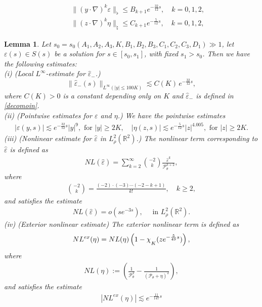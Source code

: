 \documentclass[10pt,a4paper]{amsart}
\newtheorem{lemma}{Lemma}
\newcommand{\mchi}{\raisebox{0pt}[1ex][1ex]{$\chi$}}
\newcommand{\veph}{\hat\varepsilon }
\begin{document}
\begin{align}
    &\|(y \cdot \nabla)^k\varepsilon\|_{\flat} \leq B_{k+1} e^{-\frac{32}{12}s}, \quad k=0,1,2,\label{int1}\\
   \quad  &\|(z \cdot \nabla)^k \eta \|_{\natural} \leq C_{k+1} e^{-\frac{5}{12}s}, \label{bootstrap: int 2} \quad k=0,1,2,
\end{align}

\begin{lemma}
\label{Lemma4.1}
    Let \(s_0 = s_0(A_1, A_2,A_3,K,B_1,B_2,B_3,C_1,C_2,C_3,D_1) \gg 1\), let \(\varepsilon(s) \in S(s)\) be a solution for \(s \in [s_0, s_1]\), with fixed \(s_1 > s_0\). Then we have the following estimates:\\
(i) \textup{(Local \(L^{\infty}\)-estimate for \(\veph_-\).) }
    \begin{equation*}
        \|\veph_-(s)\|_{L^{\infty}(|y| \leq 100K)} \lesssim C(K) \, e^{-\frac{32}{12}s},
    \end{equation*}
    where \(C(K)>0\) is a constant depending only on \(K\) and \(\veph_-\) is defined in \ref{decomoin}.\\
(ii) \textup{(Pointwise estimates for \(\varepsilon\) and \(\eta\)}.) 
We have the pointwise estimates
\begin{align*}
    |\varepsilon(y,s)| \lesssim e^{-\frac{32}{12}s}|y|^9, \text{ for } |y| \geq 2K, \quad |\eta(z,s)| \lesssim e^{-\frac{5}{12}s}|z|^{4.005}, \text{ for } |z| \geq 2K.
\end{align*}
(iii) \textup{(Nonlinear estimate for \(\veph\) in \(L^2_{\rho}(\mathbb{R}^2)\).)} 
The nonlinear term corresponding to \(\veph\) is defined as
\begin{align*}
        NL(\veph)=\sum_{k=2}^{\infty}\binom{-2}{k}\frac{\veph^k}{\mathcal{P}_{\theta}^{k+2}},
    \end{align*}
    where 
    \begin{align*} \binom{-2}{k}=\frac{(-2) \cdot (-3) \cdots(-2-k+1)}{k!}, \quad k \geq 2,
    \end{align*}
    and satisfies the estimate
    \begin{align*}
        NL(\veph)=o(se^{-3s}), \quad \text{ in } L^2_{\rho}(\mathbb{R}^2).
\end{align*}
(iv) \textup{(Exterior nonlinear estimate)}
The exterior nonlinear term is defined as
\begin{align*}
    NL^{ex}(\eta)=NL(\eta)\left(1-\mchi_{K}(ze^{-\frac{5}{49}s})\right),
\end{align*}
where
\begin{align*}
    NL(\eta):=\left(\frac{1}{\mathcal{P}_{\theta}^2}-\frac{1}{(\mathcal{P}_{\theta}+\eta)^2}\right),
\end{align*}
and satisfies the estimate
\begin{align*}
    |NL^{ex}(\eta)| \lesssim e^{-\frac{11}{147}s}
\end{align*}
\end{lemma}
\end{document}
